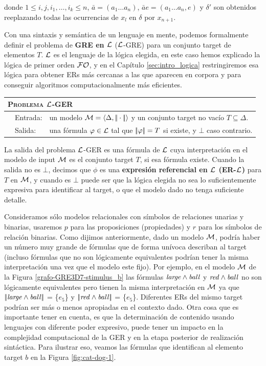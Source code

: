 donde $1 \le i,j, i_1, \ldots, i_k \le n$, $\bar{a} = (a_1\ldots
a_n)$, $\bar{a}e = (a_1\ldots a_n,e)$ y $\delta'$ son
obtenidos reeplazando todas las ocurrencias de $x_l$ en $\delta$ por
$x_{n+1}$. 

Con una sintaxis y sem\'antica de un lenguaje en mente, podemos formalmente definir el problema de \textbf{GRE en $\mathcal{L}$} ($\mathcal{L}$-GRE) para un conjunto target de elementos $T$. $\mathcal{L}$ es el lenguaje de la l\'ogica elegida, en este caso hemos explicado la l\'ogica de primer orden $\mathcal{FO}$, y en el Cap\'itulo \ref{sec:intro_logica} restringiremos esa l\'ogica para obtener ERs m\'as cercanas a las que aparecen en corpora y para conseguir algoritmos computacionalmente m\'as eficientes.

\medskip
\noindent
{\small
\begin{center}
\begin{tabular}{ll} \hline
\multicolumn{2}{l}{
\textsc{Problema $\mathcal{L}$-GER }}\\ \hline
\ \ Entrada: & un modelo $\mathcal{M}=\langle \Delta,|\!|\cdot|\!| \rangle$ y un conjunto target no vac\'io $T \subseteq \Delta$.\\
\ \ Salida: & una f\'ormula $\varphi \in \mathcal{L}$ tal que
$|\!|\varphi|\!| = T$ si existe, y $\bot$ caso contrario.\\ \hline
\end{tabular}
\end{center}}

La salida del problema $\mathcal{L}$-GER es una f\'ormula de
$\mathcal{L}$ cuya interpretaci\'on en el modelo de input $\mathcal{M}$ es el conjunto target $T$, si
esa f\'ormula existe. 
Cuando la salida no es $\bot$, decimos que $\phi$ es una
\textbf{expresi\'on referencial en $\mathcal{L}$ (ER-$\mathcal{L}$)} para $T$ en $\mathcal{M}$, y cuando es $\bot$ puede ser que la l\'ogica elegida no sea lo suficientemente expresiva para identificar al target, o que el modelo dado no tenga suficiente detalle.

Consideramos s\'olo modelos relacionales con s\'imbolos de relaciones unarias y binarias, usaremos $p$ para las proposiciones (propiedades) y $r$ para los s\'imbolos de relaci\'on binarias.
Como dijimos anteriormente, dado un modelo $\mathcal{M}$, podr\'ia haber un n\'umero muy grande de f\'ormulas que de forma un\'ivoca
describan al target (incluso f\'ormulas que no son l\'ogicamente equivalentes podr\'ian tener
la misma interpretaci\'on una vez que el modelo este fijo). Por ejemplo, en el modelo $\mathcal{M}$ de la Figura \ref{grafo-GRE3D7-stimulus_b} las f\'ormulas $\mathit{large} \land \mathit{ball}$ y $\mathit{red} \land \mathit{ball}$ no son l\'ogicamente equivalentes pero tienen la misma interpretaci\'on en $\mathcal{M}$ ya que $|\!|\mathit{large} \land \mathit{ball}|\!|$ = \{$e_5$\} y $|\!|\mathit{red} \land \mathit{ball}|\!|$ = \{$e_5$\}.
Diferentes ERs
del mismo target podr\'ian ser m\'as o menos apropiadas en el contexto dado. Otra cosa que es importante tener en cuenta, es que la determinaci\'on de contenido usando lenguajes con diferente poder expresivo, puede tener un impacto en la complejidad computacional de la GER y en la etapa posterior de realizaci\'on sint\'actica. Para ilustrar eso, veamos las f\'ormulas que identifican al elemento target $b$ en la Figura \ref{fig:cat-dog-1}.

